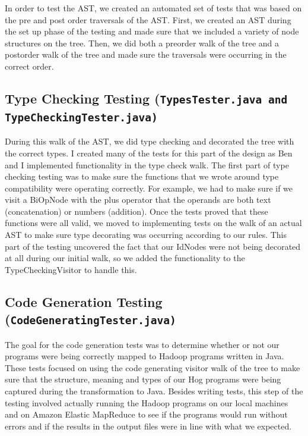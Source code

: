 \documentclass{report}
\begin{document}
In order to test the AST, we created an automated set of tests that was based on the pre and post order traversals of the AST. First, we created an AST during the set up phase of the testing and made sure that we included a variety of node structures on the tree. Then, we did both a preorder walk of the tree and a postorder walk of the tree and made sure the traversals were occurring in the correct order.  

\subsection*{Type Checking Testing (\tt TypesTester.java\rm \,and \tt  TypeCheckingTester.java\rm)}

During this walk of the AST, we did type checking and decorated the tree with the correct types. I created many of the tests for this part of the design as Ben and I implemented functionality in the type check walk. The first part of type checking testing was to make sure the functions that we wrote around type compatibility were operating correctly. For example, we had to make sure if we visit a BiOpNode with the plus operator that the operands are both text (concatenation) or numbers (addition). Once the tests proved that these functions were all valid, we moved to implementing tests on the walk of an actual AST to make sure type decorating was occurring according to our rules. This part of the testing uncovered the fact that our IdNodes were not being decorated at all during our initial walk, so we added the functionality to the TypeCheckingVisitor to handle this.  

\subsection*{Code Generation Testing (\tt CodeGeneratingTester.java\rm)}

The goal for the code generation tests was to determine whether or not our programs were being correctly mapped to Hadoop programs written in Java. These tests focused on using the code generating visitor walk of the tree to make sure that the structure, meaning and types of our Hog programs were being captured during the transformation to Java. Besides writing tests, this step of the testing involved actually running the Hadoop programs on our local machines and on Amazon Elastic MapReduce to see if the programs would run without errors and if the results in the output files were in line with what we expected.
\end{document}
